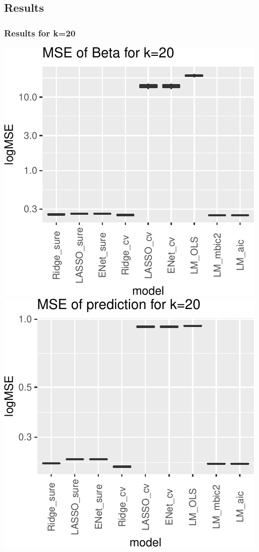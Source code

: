 \documentclass[
]{article}
\begin{document}
\hypertarget{results-1}{%
\subsection{Results}\label{results-1}}

\hypertarget{results-for-k20-1}{%
\subsubsection{Results for k=20}\label{results-for-k20-1}}

\includegraphics[width=0.8\linewidth]{report_files/figure-latex/unnamed-chunk-7-1}
\includegraphics[width=0.8\linewidth]{report_files/figure-latex/unnamed-chunk-7-2}
\end{document}
